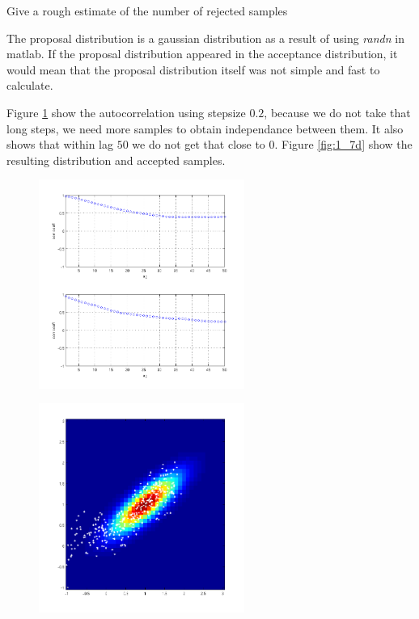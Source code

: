 \documentclass[a4paper, 10pt, final]{article}
\begin{document}
Give a rough estimate of the number of rejected samples

The proposal distribution is a gaussian distribution as a result of
using \emph{randn} in matlab. If the proposal distribution appeared in
the acceptance distribution, it would mean that the proposal
distribution itself was not simple and fast to calculate. 

Figure \ref{fig:q1_7c} show the autocorrelation using stepsize $0.2$,
because we do not take that long steps, we need more samples to obtain
independance between them. It also shows that within lag $50$ we do
not get that close to $0$. Figure \ref{fig:1_7d} show the resulting
distribution and accepted samples.

\begin{figure}[!htpb]
  \centering
  \includegraphics[width=0.6\textwidth]{images/q1_7c}
  \caption{}
  \label{fig:q1_7c}
\end{figure}

\begin{figure}[!htpb]
  \centering
  \includegraphics[width=0.6\textwidth]{images/q1_7d}
  \caption{}
  \label{fig:q1_7d}
\end{figure}
\end{document}
